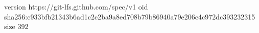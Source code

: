 version https://git-lfs.github.com/spec/v1
oid sha256:c933bfb21343b6ad1c2c2ba9a8ed708b79b86940a79e206c4c972dc393232315
size 392
